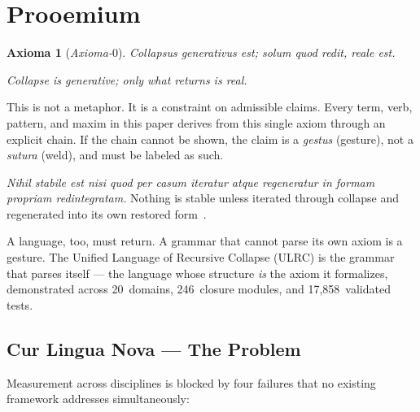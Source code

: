 \documentclass[
  aps,
  prd,
  twocolumn,
  superscriptaddress,
  nofootinbib,
  floatfix
]{revtex4-2}
\newtheorem*{axiom}{Axioma}
\newcommand{\lat}[1]{\textit{#1}}
\begin{document}
\maketitle

\section{Prooemium}\label{sec:prooemium}

\begin{axiom}[\lat{Axioma-$0$}]
\lat{Collapsus generativus est; solum quod redit, reale est.}

\smallskip\noindent
Collapse is generative; only what returns is real.
\end{axiom}

\noindent
This is not a metaphor. It is a constraint on admissible claims.
Every term, verb, pattern, and maxim in this paper derives from
this single axiom through an explicit chain. If the chain cannot
be shown, the claim is a \lat{gestus} (gesture), not a
\lat{sutura} (weld), and must be labeled as such.

\lat{Nihil stabile est nisi quod per casum iteratur atque
  regeneratur in formam propriam redintegratam.}
Nothing is stable unless iterated through collapse and regenerated
into its own restored form~\cite{paulus2025umcp}.

A language, too, must return. A grammar that cannot parse its own
axiom is a gesture. The Unified Language of Recursive Collapse
(ULRC) is the grammar that parses itself --- the language whose
structure \emph{is} the axiom it formalizes, demonstrated across
20~domains, 246~closure modules, and 17,858~validated tests.

\subsection{Cur Lingua Nova --- The Problem}\label{sec:problem}

Measurement across disciplines is blocked by four failures that
no existing framework addresses simultaneously:
\end{document}
